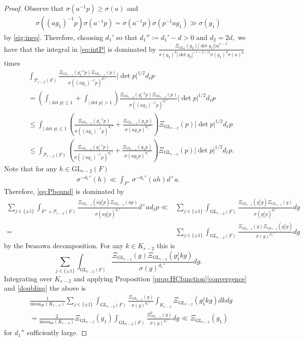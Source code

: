 \documentclass[12pt]{amsart}
\theoremstyle{remark}
\numberwithin{equation}{section}
\newcommand{\GL}{\mathrm{GL}}
\theoremstyle{definition}
\numberwithin{equation}{subsection}
\begin{document}
\begin{proof}
Observe that $\sigma(a^{-1}p)\ge \sigma(a)$ and 
\begin{align*}
    \sigma((ag_1)^{-1}p)\sigma(a^{-1}p)=\sigma(a^{-1}p)\sigma(p^{-1}ag_1 )\gg \sigma(g_1)
\end{align*} by \eqref{sig:ineq}.
Therefore, choosing $d_1'$ so that $d_1'':=d_1'-d>0$ and $d_2=2d,$ we have that the integral in
 \eqref{eq:intP} is dominated by $\frac{\Xi_{\GL_{2}}(g_2)|\det g_1||a|^{r-2}}{\sigma(g_2)^d|\det g_2|^{(r-2)/2}\sigma(g_1)^{d}\sigma(a)^{d}}$ times
\begin{align} \label{eq:Pbound}
    \nonumber&\int_{\mathcal{P}_{r-2}(F)}\frac{\Xi_{\GL_{r-2}}(g_1^{-1}p)\Xi_{\GL_{r-2}}(p)}{\sigma
        ((ag_1)^{-1}p)^{d_1''}}|\det p|^{1/2}d_\ell p\\
    \nonumber&=\left(\int_{|\det p|\le 1}+\int_{|\det p|> 1}\right)\frac{\Xi_{\GL_{r-2}}(g_1^{-1}p)\Xi_{\GL_{r-2}}(p)}{\sigma
        ((ag_1)^{-1}p)^{d_1''}}|\det p|^{1/2}d_\ell p\\
    \nonumber&\le \int_{|\det p|\le 1} \left(\frac{\Xi_{\GL_{r-2}}(g_1^{-1}p)}{\sigma
        ((ag_1)^{-1}p)^{d_1''}}+\frac{\Xi_{\GL_{r-2}}(g_1p)}{\sigma
        (ag_1p)^{d_1''}}\right)\Xi_{\GL_{r-2}}(p)|\det p|^{1/2}d_\ell p\\  
    &\le \int_{\mathcal{P}_{r-2}(F)}\left(\frac{\Xi_{\GL_{r-2}}(g_1^{-1}p)}{\sigma
        ((ag_1)^{-1}p)^{d_1''}}+\frac{\Xi_{\GL_{r-2}}(g_1p)}{\sigma
        (ag_1p)^{d_1''}}\right)\Xi_{\GL_{r-2}}(p)|\det p|^{1/2}d_\ell p.
\end{align}
Note that for any $h\in \GL_{r-2}(F)$
\begin{align*}
    \sigma^{-d_1''}(h)\ll \int_{F^\times} \sigma^{-d_1''}(ah) d^\times a.
\end{align*}
Therefore, \eqref{eq:Pbound} is dominated by
\begin{align*}
\sum_{j \in \{\pm 1\}}\int_{F^\times \times \mathcal{P}_{r-2}(F)}\frac{\Xi_{\GL_{r-2}}(ag_1^{j}p)\Xi_{\GL_{r-2}}(ap)}{\sigma(ag_1^{j}p)^{d_1''}}d^\times ad_\ell p
\ll &\sum_{j\in\{\pm 1\}}\int_{\GL_{r-2}(F)}\frac{\Xi_{\GL_{r-2}}(g_1^{j}g)\Xi_{\GL_{r-2}}(g)}{\sigma(g_1^{j}g)^{d_1''}} dg\\
=&\sum_{j\in\{\pm 1\}}\int_{\GL_{r-2}(F)}\frac{\Xi_{\GL_{r-2}}(g)\Xi_{\GL_{r-2}}(g_1^{j}g)}{\sigma(g)^{d_1''}} dg
\end{align*}
by the Iwasawa decomposition. For any $k \in K_{r-2}$ this is 
$$\sum_{j\in\{\pm 1\}}\int_{\GL_{r-2}(F)}\frac{\Xi_{\GL_{r-2}}(g)\Xi_{\GL_{r-2}}(g_1^{j}kg)}{\sigma(g)^{d_1''}} dg.
$$
Integrating over $K_{r-2}$ and applying  Proposition \ref{prop:HCfunction}\ref{convergence} and \ref{doubling} the above is
\begin{align*}
    &\frac{1}{\mathrm{meas}_{dk}(K_{r-2})}\sum_{j \in \{\pm 1\}}\int_{\GL_{r-2}(F)}\frac{\Xi_{\GL_{r-2}}(g)}{\sigma(g)^{d_1''}}\int_{K_{r-2}}\Xi_{\GL_{r-2}}(g_1^jkg)dkdg\\&=\frac{2}{\mathrm{meas}_{dk}(K_{r-2})}\Xi_{\GL_{r-2}}(g_1)\int_{\GL_{r-2}(F)}\frac{\Xi_{\GL_{r-2}}^2(g)}{\sigma(g)^{d_1''}}dg \ll \Xi_{\GL_{r-2}}(g_1)
\end{align*}
 for $d_1''$ sufficiently large.


\end{proof}
\end{document}
